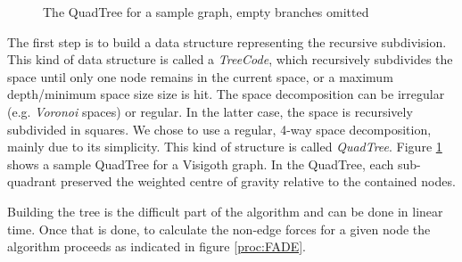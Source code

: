 \documentclass[a4paper,11pt,titlepage]{article}
\begin{document}
\begin{figure}
{\begin{tikzpicture}[y=0.80pt, x=0.8pt,yscale=-0.5, xscale=0.5, inner sep=0pt, outer sep=0pt]
    \end{tikzpicture}
  }
  \hspace{10pt}
  \caption{The QuadTree for a sample graph, empty branches omitted}
  \label{fig:quadtree}
\end{figure}

The first step is to build a data structure representing the recursive subdivision. This
kind of data structure is called a \emph{TreeCode}, which recursively subdivides the space
until only one node remains in the current space, or a maximum depth/minimum space size
size is hit. The space decomposition can be irregular (e.g. \emph{Voronoi} spaces) or
regular. In the latter case, the space is recursively subdivided in squares. We chose to
use a regular, 4-way space decomposition, mainly due to its simplicity. This kind of
structure is called \emph{QuadTree}. Figure \ref{fig:quadtree} shows a sample QuadTree for
a Visigoth graph. In the QuadTree, each sub-quadrant preserved the weighted centre of
gravity relative to the contained nodes.

Building the tree is the difficult part of the algorithm and can be done in linear time.
Once that is done, to calculate the non-edge forces for a given node the algorithm
proceeds as indicated in figure \ref{proc:FADE}.
\end{document}
